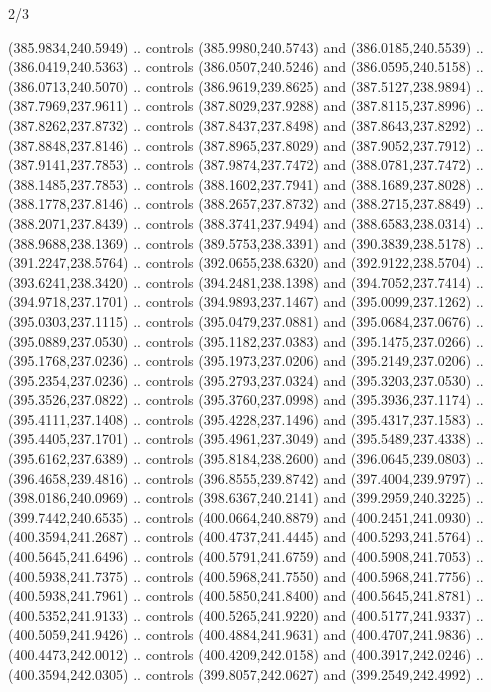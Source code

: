 \begin{flagdescription}{2/3}
\begin{scope}[xshift=0.5\flaglength,yshift=0.5\flagwidth,scale=\flagwidth/495.65]
\begin{scope}[y=0.8pt, x=0.8pt, yscale=-1,shift={(-463.76,-309.78)}]
  (385.9834,240.5949) .. controls (385.9980,240.5743) and (386.0185,240.5539) ..
  (386.0419,240.5363) .. controls (386.0507,240.5246) and (386.0595,240.5158) ..
  (386.0713,240.5070) .. controls (386.9619,239.8625) and (387.5127,238.9894) ..
  (387.7969,237.9611) .. controls (387.8029,237.9288) and (387.8115,237.8996) ..
  (387.8262,237.8732) .. controls (387.8437,237.8498) and (387.8643,237.8292) ..
  (387.8848,237.8146) .. controls (387.8965,237.8029) and (387.9052,237.7912) ..
  (387.9141,237.7853) .. controls (387.9874,237.7472) and (388.0781,237.7472) ..
  (388.1485,237.7853) .. controls (388.1602,237.7941) and (388.1689,237.8028) ..
  (388.1778,237.8146) .. controls (388.2657,237.8732) and (388.2715,237.8849) ..
  (388.2071,237.8439) .. controls (388.3741,237.9494) and (388.6583,238.0314) ..
  (388.9688,238.1369) .. controls (389.5753,238.3391) and (390.3839,238.5178) ..
  (391.2247,238.5764) .. controls (392.0655,238.6320) and (392.9122,238.5704) ..
  (393.6241,238.3420) .. controls (394.2481,238.1398) and (394.7052,237.7414) ..
  (394.9718,237.1701) .. controls (394.9893,237.1467) and (395.0099,237.1262) ..
  (395.0303,237.1115) .. controls (395.0479,237.0881) and (395.0684,237.0676) ..
  (395.0889,237.0530) .. controls (395.1182,237.0383) and (395.1475,237.0266) ..
  (395.1768,237.0236) .. controls (395.1973,237.0206) and (395.2149,237.0206) ..
  (395.2354,237.0236) .. controls (395.2793,237.0324) and (395.3203,237.0530) ..
  (395.3526,237.0822) .. controls (395.3760,237.0998) and (395.3936,237.1174) ..
  (395.4111,237.1408) .. controls (395.4228,237.1496) and (395.4317,237.1583) ..
  (395.4405,237.1701) .. controls (395.4961,237.3049) and (395.5489,237.4338) ..
  (395.6162,237.6389) .. controls (395.8184,238.2600) and (396.0645,239.0803) ..
  (396.4658,239.4816) .. controls (396.8555,239.8742) and (397.4004,239.9797) ..
  (398.0186,240.0969) .. controls (398.6367,240.2141) and (399.2959,240.3225) ..
  (399.7442,240.6535) .. controls (400.0664,240.8879) and (400.2451,241.0930) ..
  (400.3594,241.2687) .. controls (400.4737,241.4445) and (400.5293,241.5764) ..
  (400.5645,241.6496) .. controls (400.5791,241.6759) and (400.5908,241.7053) ..
  (400.5938,241.7375) .. controls (400.5968,241.7550) and (400.5968,241.7756) ..
  (400.5938,241.7961) .. controls (400.5850,241.8400) and (400.5645,241.8781) ..
  (400.5352,241.9133) .. controls (400.5265,241.9220) and (400.5177,241.9337) ..
  (400.5059,241.9426) .. controls (400.4884,241.9631) and (400.4707,241.9836) ..
  (400.4473,242.0012) .. controls (400.4209,242.0158) and (400.3917,242.0246) ..
  (400.3594,242.0305) .. controls (399.8057,242.0627) and (399.2549,242.4992) ..

\end{scope}
\end{scope}
\end{flagdescription}
